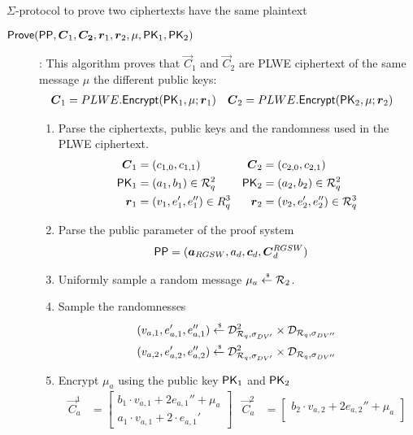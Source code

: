 \begin{section}{$\Sigma$-protocol to prove two ciphertexts have the same plaintext~\label{ProofSamePlaintext}}
\begin{description}
      \item [$\Prove(\PPP, \vec{C}_1, \vec{C_2}, \vec{r}_1, \vec{r}_2, \mu, \PK_1, \PK_2)$]:
      This algorithm proves that $\vec{C}_1$ and $\vec{C}_2$ are PLWE ciphertext of the same message $\mu$
      \wrt the different public keys:
      \begin{align*}
        \vec{C}_1 &= PLWE.\Enc(\PK_1, \mu; \vec{r}_1) &  \vec{C}_2 &= PLWE.\Enc(\PK_2, \mu; \vec{r}_2)
      \end{align*}
      \begin{enumerate}
        \item Parse the ciphertexts, public keys and the randomness used in the PLWE ciphertext.
        \begin{align*}
          \vec{C}_1 &= (c_{1,0}, c_{1,1}) & \vec{C}_2 &= (c_{2,0}, c_{2,1})\\
          \PK_1 &= (a_1, b_1) \in \R_q^2 & \PK_2 &= (a_2, b_2) \in \R_q^2 \\
          \vec{r}_1 &= (v_1, e_1', e_1'') \in R_q^3 & \vec{r}_2 &= (v_2, e_2', e_2'') \in \R_q^3
        \end{align*}
        \item Parse the public parameter of the proof system
        \begin{align*}
          \PPP &= (\vec{a}_{RGSW}, a_d, \vec{c}_d, \vec{C}_{d}^{RGSW})
        \end{align*}
        \item Uniformly sample a random message $\mu_a \stackrel{{\scriptscriptstyle \mkern4mu \$}}{\gets} {\mathcal{R}}_2$.
        \item Sample the randomnesses
        \begin{align*}
          (v_{a,1}, e_{a,1}', e_{a,1}'') &\stackrel{{\scriptscriptstyle \mkern4mu \$}}{\gets} \mathcal{D}^2_{{\mathcal{R}}_q, \sigma_{DV'}} \times \mathcal{D}_{{\mathcal{R}}_q, \sigma_{DV''}}\\
          (v_{a,2}, e_{a,2}', e_{a,2}'') &\stackrel{{\scriptscriptstyle \mkern4mu \$}}{\gets} \mathcal{D}_{{\mathcal{R}}_q, \sigma_{DV'}}^2 \times \mathcal{D}_{{\mathcal{R}}_q, \sigma_{DV''}}
        \end{align*}
        \item Encrypt $\mu_a$ using the public key $\mathsf{PK}_1$ and $\mathsf{PK}_2$
        \begin{align*}
          \vec{C}_{a}^{1} &=
          \begin{bmatrix} b_1 \cdot v_{a,1} + 2 e_{a,1}''+ \mu_a  \\
            a_1 \cdot v_{a,1} + 2 \cdot e_{a,1}' \end{bmatrix} &
            \vec{C}_{a}^{2} &= \begin{bmatrix} b_2 \cdot v_{a,2} + 2 e_{a,2}''+ \mu_a \\

\end{bmatrix}
\end{align*}
\end{enumerate}
\end{description}
\end{section}
